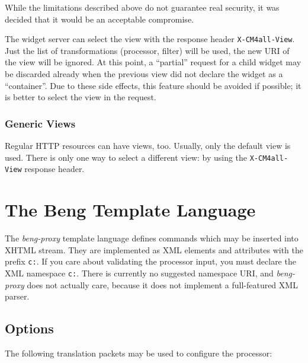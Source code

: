 \documentclass[a4paper,12pt]{article}
\begin{document}
While the limitations described above do not guarantee real
security, it was decided that it would be an acceptable compromise.

The widget server can select the view with the response header
\texttt{X-CM4all-View}.  Just the list of transformations (processor,
filter) will be used, the new URI of the view will be ignored.  At
this point, a ``partial'' request for a child widget may be discarded
already when the previous view did not declare the widget as a
``container''.  Due to these side effects, this feature should be
avoided if possible; it is better to select the view in the request.

\subsubsection{Generic Views}

Regular HTTP resources can have views, too.  Usually, only the default
view is used.  There is only one way to select a different view: by
using the \texttt{X-CM4all-View} response header.

\section{The Beng Template Language}
\label{processor}

The \emph{beng-proxy} template language defines commands which may be
inserted into XHTML stream.  They are implemented as XML elements and
attributes with the prefix \texttt{c:}.  If you care about validating
the processor input, you must declare the XML namespace \texttt{c:}.
There is currently no suggested namespace URI, and \emph{beng-proxy}
does not actually care, because it does not implement a full-featured
XML parser.

\subsection{Options}

The following translation packets may be used to configure the
processor:
\end{document}
